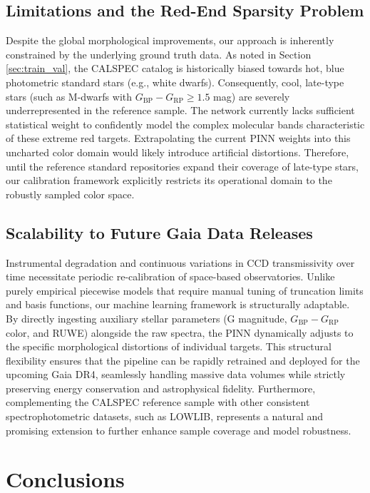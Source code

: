 \documentclass{aa}
\begin{document}
\subsection{Limitations and the Red-End Sparsity Problem}
Despite the global morphological improvements, our approach is inherently constrained by the underlying ground truth data. As noted in Section \ref{sec:train_val}, the CALSPEC catalog is historically biased towards hot, blue photometric standard stars (e.g., white dwarfs). Consequently, cool, late-type stars (such as M-dwarfs with $G_{\text{BP}}-G_{\text{RP}} \ge 1.5$ mag) are severely underrepresented in the reference sample. The network currently lacks sufficient statistical weight to confidently model the complex molecular bands characteristic of these extreme red targets. Extrapolating the current PINN weights into this uncharted color domain would likely introduce artificial distortions. Therefore, until the reference standard repositories expand their coverage of late-type stars, our calibration framework explicitly restricts its operational domain to the robustly sampled color space.

\subsection{Scalability to Future Gaia Data Releases}
Instrumental degradation and continuous variations in CCD transmissivity over time necessitate periodic re-calibration of space-based observatories. Unlike purely empirical piecewise models that require manual tuning of truncation limits and basis functions, our machine learning framework is structurally adaptable. By directly ingesting auxiliary stellar parameters (G magnitude, $G_{\mathrm{BP}} - G_{\mathrm{RP}}$ color, and RUWE) alongside the raw spectra, the PINN dynamically adjusts to the specific morphological distortions of individual targets. This structural flexibility ensures that the pipeline can be rapidly retrained and deployed for the upcoming Gaia DR4, seamlessly handling massive data volumes while strictly preserving energy conservation and astrophysical fidelity. Furthermore, complementing the CALSPEC reference sample with other consistent spectrophotometric datasets, such as LOWLIB, represents a natural and promising extension to further enhance sample coverage and model robustness.





\section{Conclusions} \label{sec:conclusions}
\end{document}
